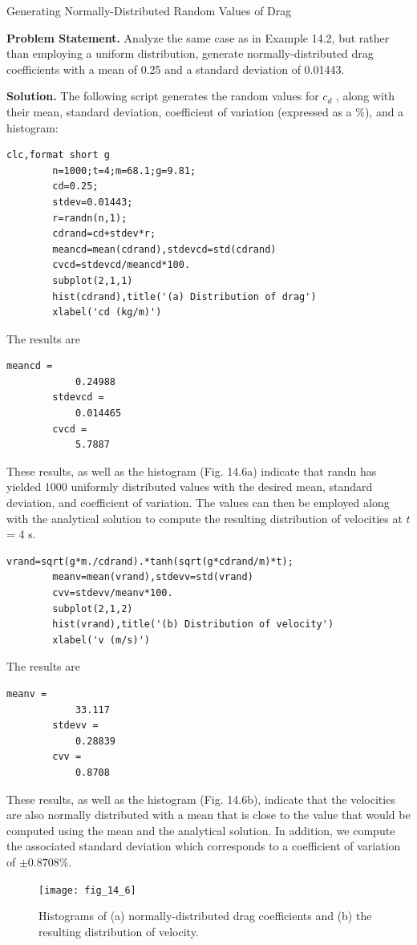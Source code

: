 \documentclass[../main.tex]{subfiles}
\begin{document}
\begin{example} Generating Normally-Distributed Random Values of Drag
	
	\noindent \textbf{Problem Statement. } \quad Analyze the same case as in Example 14.2, but rather than employing a uniform distribution, generate normally-distributed drag coefficients with a mean of
	0.25 and a standard deviation of 0.01443.

	\noindent \textbf{Solution. } \quad The following script generates the random values for $c_d$ , along with their mean,
	standard deviation, coefficient of variation (expressed as a \%), and a histogram:

	\begin{lstlisting}[numbers=none]
		clc,format short g
		n=1000;t=4;m=68.1;g=9.81;
		cd=0.25;
		stdev=0.01443;
		r=randn(n,1);
		cdrand=cd+stdev*r;
		meancd=mean(cdrand),stdevcd=std(cdrand)
		cvcd=stdevcd/meancd*100.
		subplot(2,1,1)
		hist(cdrand),title('(a) Distribution of drag')
		xlabel('cd (kg/m)')
	\end{lstlisting}

	\noindent  The results are

	\begin{lstlisting}[numbers=none]
		meancd =
			0.24988
		stdevcd =
			0.014465
		cvcd =
			5.7887
	\end{lstlisting}

	\noindent These results, as well as the histogram (Fig. 14.6a) indicate that randn has yielded 1000
	uniformly distributed values with the desired mean, standard deviation, and coefficient
	of variation. The values can then be employed along with the analytical solution to compute the resulting distribution of velocities at $t$ = 4 s.

	\begin{lstlisting}[numbers=none]
		vrand=sqrt(g*m./cdrand).*tanh(sqrt(g*cdrand/m)*t);
		meanv=mean(vrand),stdevv=std(vrand)
		cvv=stdevv/meanv*100.
		subplot(2,1,2)
		hist(vrand),title('(b) Distribution of velocity')
		xlabel('v (m/s)')
	\end{lstlisting}

	\noindent The results are

	\begin{lstlisting}[numbers=none]
		meanv =
			33.117
		stdevv =
			0.28839
		cvv =
			0.8708
	\end{lstlisting}

	\noindent These results, as well as the histogram (Fig. 14.6b), indicate that the velocities are also normally distributed with a mean that is close to the value that would be computed using the
	mean and the analytical solution. In addition, we compute the associated standard deviation
	which corresponds to a coefficient of variation of $\pm 0.8708\%$.

	\begin{figure}[H]
		\centering
		\texttt{[image: fig\_14\_6]}
		\caption{\textsf{Histograms of (a) normally-distributed drag coefficients and (b) the resulting distribution of velocity.}}
		\label{fig:fig_14_6}
	\end{figure}
\end{example}
\end{document}
